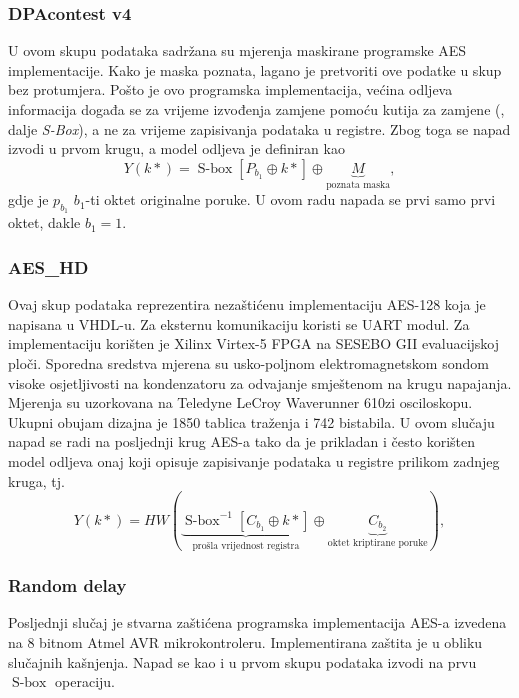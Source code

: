 \documentclass[times, utf8, diplomski]{fer}
\newcommand\aessbox{\operatorname{S-box}}   %
\begin{document}
\subsubsection{DPAcontest v4}
U ovom skupu podataka sadržana su mjerenja maskirane programske AES implementacije. Kako je maska poznata, lagano je pretvoriti ove podatke u skup bez protumjera. Pošto je ovo programska implementacija, većina odljeva informacija događa se za vrijeme izvođenja zamjene pomoću kutija za zamjene (, dalje \emph{S-Box}), a ne za vrijeme zapisivanja podataka u registre. Zbog toga se napad izvodi u prvom krugu, a model odljeva je definiran kao
\begin{equation}
    Y(k*) = \aessbox{}\left[ P_{b_1} \oplus k* \right] \oplus \underbrace{M}_\text{poznata maska},
\end{equation}
gdje je $p_{b_1}$ $b_1$-ti oktet originalne poruke. U ovom radu napada se prvi samo prvi oktet, dakle $b_1 = 1$.


\subsubsection{AES\_HD} Ovaj skup podataka reprezentira nezaštićenu implementaciju AES-128 koja je napisana u VHDL-u. Za eksternu komunikaciju koristi se UART modul. Za implementaciju korišten je Xilinx Virtex-5 FPGA na SESEBO GII evaluacijskoj ploči. Sporedna sredstva mjerena su usko-poljnom elektromagnetskom sondom visoke osjetljivosti na kondenzatoru za odvajanje smještenom na krugu napajanja. Mjerenja su uzorkovana na Teledyne LeCroy Waverunner 610zi osciloskopu. Ukupni obujam dizajna je 1850 tablica traženja  i 742 bistabila. U ovom slučaju napad se radi na posljednji krug AES-a tako da je prikladan i često korišten model odljeva onaj koji opisuje zapisivanje podataka u registre prilikom zadnjeg kruga, tj.
\begin{equation}
    Y(k*) = HW(\underbrace{\aessbox^{-1} \left[ C_{b_1} \oplus k* \right]}_\text{prošla vrijednost registra} \oplus \underbrace{C_{b_2}}_\text{oktet kriptirane poruke}),
\end{equation}

\subsubsection{Random delay}
Posljednji slučaj je stvarna zaštićena programska implementacija AES-a izvedena na 8 bitnom Atmel AVR mikrokontroleru. Implementirana zaštita je u obliku slučajnih kašnjenja. Napad se kao i u prvom skupu podataka izvodi na prvu $\aessbox$ operaciju.
\end{document}
